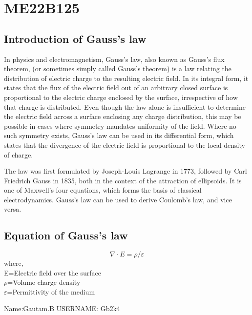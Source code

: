\section{ME22B125}
\subsection{Introduction of Gauss's law}
In physics and electromagnetism, Gauss's law, also known as Gauss's flux theorem, (or sometimes simply called Gauss's theorem) is a law relating the distribution of electric charge to the resulting electric field. In its integral form, it states that the flux of the electric field out of an arbitrary closed surface is proportional to the electric charge enclosed by the surface, irrespective of how that charge is distributed. Even though the law alone is insufficient to determine the electric field across a surface enclosing any charge distribution, this may be possible in cases where symmetry mandates uniformity of the field. Where no such symmetry exists, Gauss's law can be used in its differential form, which states that the divergence of the electric field is proportional to the local density of charge.

The law was first formulated by Joseph-Louis Lagrange in 1773, followed by Carl Friedrich Gauss in 1835, both in the context of the attraction of ellipsoids. It is one of Maxwell's four equations, which forms the basis of classical electrodynamics. Gauss's law can be used to derive Coulomb's law, and vice versa.

\subsection{Equation of Gauss's law}
 $$\nabla \cdot E=\rho / \varepsilon$$
 where,\\
 E=Electric field over the surface\\
 $\rho$=Volume charge density\\
 $\varepsilon$=Permittivity of the medium

 
 

Name:Gautam.B
USERNAME: Gb2k4
